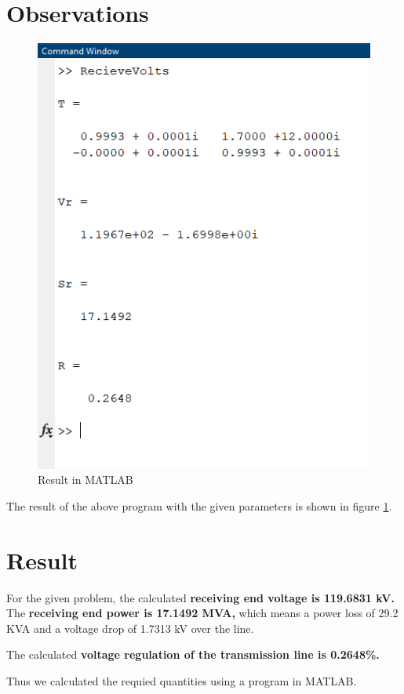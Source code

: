 \documentclass[a4paper,12pt]{article}
\begin{document}
  \section{Observations}
  \begin{figure}[H]
    \centering
    \includegraphics{img/run.png}
    \caption{Result in MATLAB}
    \label{result}
  \end{figure}
  The result of the above program with the given parameters 
  is shown in figure \ref{result}.

  \section{Result}
  For the given problem, the calculated {\bf receiving end voltage is 119.6831 kV.}
  The {\bf receiving end power is 17.1492 MVA,} which means a power loss of 29.2 KVA 
  and a voltage drop of 1.7313 kV over the line.

  The calculated {\bf voltage regulation of the transmission line is 0.2648\%.}

  Thus we calculated the requied quantities using a program in MATLAB.
\end{document}
